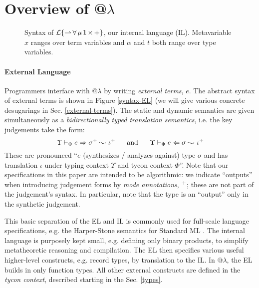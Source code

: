 \documentclass[10pt,preprint]{sigplanconf}
\newcommand{\moutput}{^{\color{gray}+}}
\begin{document}
\section{Overview of @$\lambda$}\label{atlam}\label{overview}
\begin{figure}[t]
\small
\hspace{-5px}
\caption{Syntax of {$\mathcal{L}\{{\rightharpoonup}\,{\forall}\,{\mu}\,{{\sf 1}}\,{\times}\,{+}\}$}, our internal language (IL). Metavariable $x$ ranges over term variables and $\alpha$ and $t$ both range over type variables.}
\label{syntax-IL}
\vspace{-10px}
\end{figure}
\paragraph{External Language}
Programmers interface with @$\lambda$ by writing \emph{external terms}, $e$. The abstract syntax of external terms is shown in Figure \ref{syntax-EL} (we will give various concrete desugarings in Sec. \ref{external-terms}). %
The static and dynamic semantics are given simultaneously as a \emph{bidirectionally typed translation semantics}, i.e. the key judgements take the form:\[\esynX{e}{\st\moutput}{\iota\moutput} ~~~~~\text{and}~~~~~ \eanaX{e}{\st}{\iota\moutput}\]
\noindent
These are pronounced ``$e$ (synthesizes / analyzes against) type $\sigma$ and has  translation $\iota$ under typing context $\Upsilon$ and tycon context $\Phi$''. Note that our specifications in this paper are intended to be algorithmic: we indicate ``outputs'' when introducing judgement forms by \emph{mode annotations}, $\moutput$; these are not part of the judgement's syntax. In particular, note that the type is an ``output'' only in the synthetic judgement.

This basic separation of the EL and IL is commonly used for full-scale language specifications, e.g. the Harper-Stone semantics for Standard ML \cite{Harper00atype-theoretic}. The internal language is purposely kept small, e.g. defining only binary products, to simplify metatheoretic reasoning and compilation. The EL then specifies various useful higher-level constructs, e.g. record types, by translation to the IL. In @$\lambda$, the EL builds in only function types. All other external constructs are defined in the \emph{tycon context}, described starting in the Sec. \ref{types}. 
\end{document}
